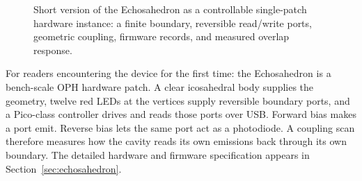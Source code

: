 \documentclass[11pt]{article}
\theoremstyle{remark}
\theoremstyle{plain}
\begin{document}
\begin{figure}[ht]
\centering
{}
\caption{Short version of the Echosahedron as a controllable single-patch hardware instance: a finite boundary, reversible read/write ports, geometric coupling, firmware records, and measured overlap response.}
\label{fig:echosahedron-short}
\end{figure}

For readers encountering the device for the first time: the Echosahedron is a bench-scale OPH hardware patch. A clear icosahedral body supplies the geometry, twelve red LEDs at the vertices supply reversible boundary ports, and a Pico-class controller drives and reads those ports over USB. Forward bias makes a port emit. Reverse bias lets the same port act as a photodiode. A coupling scan therefore measures how the cavity reads its own emissions back through its own boundary. The detailed hardware and firmware specification appears in Section~\ref{sec:echosahedron}.
\end{document}
